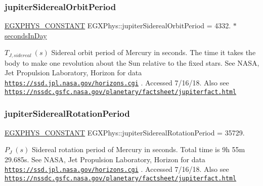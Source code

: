 \subsubsection{\texorpdfstring{jupiter\+Sidereal\+Orbit\+Period}{jupiterSiderealOrbitPeriod}}
{\footnotesize\ttfamily \mbox{\hyperlink{group___e_g_x_phys-_constants-_macros_ga76980d288494ce1714c9ac68a95ba702}{E\+G\+X\+P\+H\+Y\+S\+\_\+\+C\+O\+N\+S\+T\+A\+NT}} E\+G\+X\+Phys\+::jupiter\+Sidereal\+Orbit\+Period = 4332. $\ast$ \mbox{\hyperlink{namespace_e_g_x_phys_a93d2a00d75411b58cbf63ab3fd1f8bc2}{seconds\+In\+Day}}}

$ T_{J,sidereal} \ (s)$ Sidereal orbit period of Mercury in seconds. The time it takes the body to make one revolution about the Sun relative to the fixed stars. See N\+A\+SA, Jet Propulsion Laboratory, Horizon for data \href{https://ssd.jpl.nasa.gov/horizons.cgi}{\tt https\+://ssd.\+jpl.\+nasa.\+gov/horizons.\+cgi} . Accessed 7/16/18. Also see \href{https://nssdc.gsfc.nasa.gov/planetary/factsheet/jupiterfact.html}{\tt https\+://nssdc.\+gsfc.\+nasa.\+gov/planetary/factsheet/jupiterfact.\+html} \mbox{\label{group___e_g_x_phys-_constants-_astrophysics-_solar_system-_mercury-_orbit_gadcd54280d32940fa38030456c9978303}} 
\subsubsection{\texorpdfstring{jupiter\+Sidereal\+Rotation\+Period}{jupiterSiderealRotationPeriod}}
{\footnotesize\ttfamily \mbox{\hyperlink{group___e_g_x_phys-_constants-_macros_ga76980d288494ce1714c9ac68a95ba702}{E\+G\+X\+P\+H\+Y\+S\+\_\+\+C\+O\+N\+S\+T\+A\+NT}} E\+G\+X\+Phys\+::jupiter\+Sidereal\+Rotation\+Period = 35729.}

$ P_{J} \ (s)$ Sidereal rotation period of Mercury in seconds. Total time is 9h 55m 29.\+685s. See N\+A\+SA, Jet Propulsion Laboratory, Horizon for data \href{https://ssd.jpl.nasa.gov/horizons.cgi}{\tt https\+://ssd.\+jpl.\+nasa.\+gov/horizons.\+cgi} . Accessed 7/16/18. Also see \href{https://nssdc.gsfc.nasa.gov/planetary/factsheet/jupiterfact.html}{\tt https\+://nssdc.\+gsfc.\+nasa.\+gov/planetary/factsheet/jupiterfact.\+html} \mbox{\label{group___e_g_x_phys-_constants-_astrophysics-_solar_system-_mercury-_orbit_gaa7c9f21fa2b8062166764a6f59d0bbeb}} 
